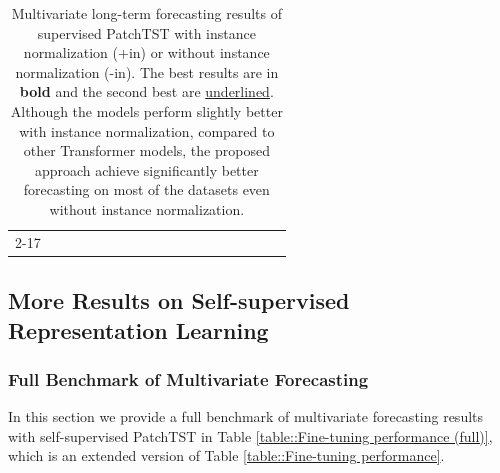 \documentclass{article} %
\begin{document}
\begin{table}[t]
{\begin{tabular}{cc|c||cc|cc|cc|cc||cc|cc|ccc}
			\cline{2-17}
		\end{tabular}
	}
	\caption{Multivariate long-term forecasting results of supervised PatchTST with instance normalization (+in) or without instance normalization (-in). The best results are in \textbf{bold} and the second best are \uline{underlined}. Although the models perform slightly better with instance normalization, compared to other Transformer models, the proposed approach achieve significantly better forecasting on most of the datasets even without instance normalization. }
	\label{tab:with and without IN}
\end{table}
\linespread{1}




\subsection{More Results on Self-supervised Representation Learning}
\label{append:self-sup}

\subsubsection{Full Benchmark of Multivariate Forecasting}

In this section we provide a full benchmark of multivariate forecasting results with self-supervised PatchTST in Table \ref{table::Fine-tuning performance (full)}, which is an extended version of Table \ref{table::Fine-tuning performance}. 
\end{document}
